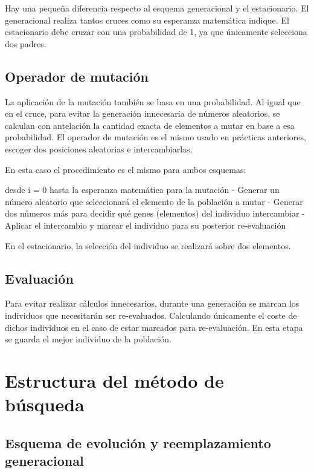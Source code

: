 \documentclass[twoside]{article}
\begin{document}
Hay una pequeña diferencia respecto al esquema generacional y el estacionario.
El generacional realiza tantos cruces como su esperanza matemática indique. El
estacionario debe cruzar con una probabilidad de 1, ya que únicamente selecciona dos padres.

\subsection{Operador de mutación}

La aplicación de la mutación también se basa en una probabilidad. Al igual
que en el cruce, para evitar la generación innecesaria de números aleatorios, se
calculan con antelación la cantidad exacta de elementos a mutar en base a esa probabilidad.
El operador de mutación es el mismo usado en prácticas anteriores, escoger dos posiciones
aleatorias e intercambiarlas.

En esta caso el procedimiento es el mismo para ambos esquemas:

\begin{pythoncode}
desde i = 0 hasta la esperanza matemática para la mutación
    - Generar un número aleatorio que seleccionará el elemento de la población a mutar
    - Generar dos números más para decidir qué genes (elementos) del individuo intercambiar
    - Aplicar el intercambio y marcar el individuo para su posterior re-evaluación
\end{pythoncode}

En el estacionario, la selección del individuo se realizará sobre dos elementos.

\subsection{Evaluación}

Para evitar realizar cálculos innecesarios, durante una generación se marcan
los individuos que necesitarán ser re-evaluados. Calculando únicamente el coste
de dichos individuos en el caso de estar marcados para re-evaluación. En
esta etapa se guarda el mejor individuo de la población.


\section{Estructura del método de búsqueda}

\subsection{Esquema de evolución y reemplazamiento generacional}
\end{document}
